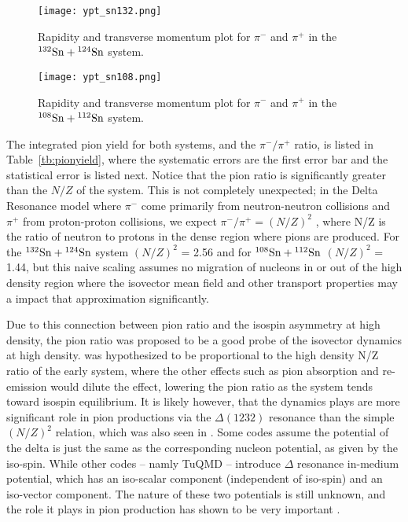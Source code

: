 \begin{figure}[!htb]
\centering
\texttt{[image: ypt\_sn132.png]}
\caption{Rapidity and transverse momentum plot for $\pi^-$ and $\pi^+$ in the ${}^{132}\mathrm{Sn} + {}^{124}\mathrm{Sn}$ system.}
\label{fig:ptrap_sn132}
\end{figure}


\begin{figure}[!htb]
\centering
\texttt{[image: ypt\_sn108.png]}
\caption{Rapidity and transverse momentum plot for $\pi^-$ and $\pi^+$ in the ${}^{108}\mathrm{Sn} + {}^{112}\mathrm{Sn}$ system.}
\label{fig:ptrap_sn108}
\end{figure}

The integrated pion yield for both systems, and the $\pi^-/\pi^+$ ratio, is listed in Table~\ref{tb:pionyield}, where the systematic errors are the first error bar and the statistical error is listed next. Notice that the pion ratio is significantly greater than the $N/Z$ of the system.  This is not completely unexpected; in the Delta Resonance model where $\pi^-$ come primarily from neutron-neutron collisions and $\pi^+$ from proton-proton collisions, we expect  $\pi^-/\pi^+ = (N/Z)^2$ \cite{baoan_piprod1,baoan_piprod2}, where N/Z is the ratio of neutron to protons in the dense region where pions are produced. For the ${}^{132}\mathrm{Sn} + {}^{124}\mathrm{Sn}$ system $(N/Z)^2$ = 2.56 and for ${}^{108}\mathrm{Sn} + {}^{112}\mathrm{Sn}$ $(N/Z)^2$ = 1.44, but this naive scaling assumes no migration of nucleons in or out of the high density region where the isovector mean field and other transport properties may a impact that approximation significantly. 


Due to this connection between pion ratio and the isospin asymmetry at high density, the pion ratio was proposed to be a good probe of the isovector dynamics at high density. was hypothesized to be proportional to the high density N/Z ratio of the early system, where the other effects such as pion absorption and re-emission would dilute the effect, lowering the pion ratio as the system tends toward isospin equilibrium. It is likely however, that the dynamics plays are more significant role in pion productions via the $\Delta(1232)$ resonance than the simple $(N/Z)^2$ relation, which was also seen in \cite{fopi}. Some codes assume the potential of the delta is just the same as the corresponding nucleon potential, as given by the iso-spin. While other codes -- namly TuQMD -- introduce $\Delta$ resonance in-medium potential, which has an iso-scalar component (independent of iso-spin) and an iso-vector component.  The nature of these two potentials is still unknown, and the role it plays in pion production has shown to be very important \cite{baoan_deltapotential, cozmaPC}.


